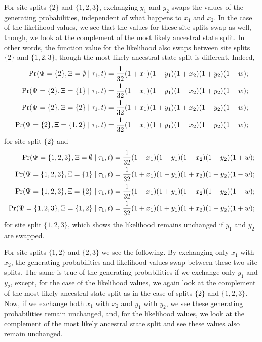 For site splits $\{2\}$ and $\{1,2,3\}$, exchanging $y_1$ and $y_2$ swaps the values of the generating probabilities, independent of what happens to $x_1$ and $x_2$.
In the case of the likelihood values, we see that the values for these site splits swap as well, though, we look at the complement of the most likely ancestral state split.
In other words, the function value for the likelihood also swaps between site splits $\{2\}$ and $\{1,2,3\}$, though the most likely ancestral state split is different.
Indeed,
\begin{align*}
    \Pr(\Psi=\{2\}, \Xi=\emptyset \mid \tau_1, t) &= \frac{1}{32}(1+x_1)(1-y_1)(1+x_2)(1+y_2)(1+w);\\
    \Pr(\Psi=\{2\}, \Xi=\{1\} \mid \tau_1, t)     &= \frac{1}{32}(1-x_1)(1-y_1)(1-x_2)(1+y_2)(1-w);\\
    \Pr(\Psi=\{2\}, \Xi=\{2\} \mid \tau_1, t)     &= \frac{1}{32}(1+x_1)(1+y_1)(1+x_2)(1-y_2)(1-w);\\
    \Pr(\Psi=\{2\}, \Xi=\{1,2\} \mid \tau_1, t)   &= \frac{1}{32}(1-x_1)(1+y_1)(1-x_2)(1-y_2)(1+w);
\end{align*}
for site split $\{2\}$ and
\begin{align*}
    \Pr(\Psi=\{1,2,3\}, \Xi=\emptyset \mid \tau_1, t) &= \frac{1}{32}(1-x_1)(1-y_1)(1-x_2)(1+y_2)(1+w);\\
    \Pr(\Psi=\{1,2,3\}, \Xi=\{1\} \mid \tau_1, t)     &= \frac{1}{32}(1+x_1)(1-y_1)(1+x_2)(1+y_2)(1-w);\\
    \Pr(\Psi=\{1,2,3\}, \Xi=\{2\} \mid \tau_1, t)     &= \frac{1}{32}(1-x_1)(1+y_1)(1-x_2)(1-y_2)(1-w);\\
    \Pr(\Psi=\{1,2,3\}, \Xi=\{1,2\} \mid \tau_1, t)   &= \frac{1}{32}(1+x_1)(1+y_1)(1+x_2)(1-y_2)(1+w);
\end{align*}
for site split $\{1,2,3\}$, which shows the likelihood remains unchanged if $y_1$ and $y_2$ are swapped.

For site splits $\{1,2\}$ and $\{2,3\}$ we see the following.
By exchanging only $x_1$ with $x_2$, the generating probabilities and likelihood values swap between these two site splits.
The same is true of the generating probabilities if we exchange only $y_1$ and $y_2$, except, for the case of the likelihood values, we again look at the complement of the most likely ancestral state split as in the case of splits $\{2\}$ and $\{1,2,3\}$.
Now, if we exchange both $x_1$ with $x_2$ and $y_1$ with $y_2$, we see these generating probabilities remain unchanged, and, for the likelihood values, we look at the complement of the most likely ancestral state split and see these values also remain unchanged.

